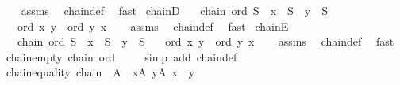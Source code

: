 \begin{isabellebody}
%
\isadelimproof
\ \ %
\endisadelimproof
%
\isatagproof
{}\isamarkupfalse%
\ assms\ \isamarkupfalse%
\ chain{\isacharunderscore}{\kern0pt}def\ \isamarkupfalse%
\ fast%
\endisatagproof
{\isafoldproof}%
%
\isadelimproof
\isanewline
%
\endisadelimproof
\isanewline
{}\isamarkupfalse%
\ chainD{\isacharcolon}{\kern0pt}\isanewline
\ \ \ {\isachardoublequoteopen}chain\ ord\ S{\isachardoublequoteclose}\ \ {\isachardoublequoteopen}x\ {\isasymin}\ S{\isachardoublequoteclose}\ \ {\isachardoublequoteopen}y\ {\isasymin}\ S{\isachardoublequoteclose}\isanewline
\ \ \ {\isachardoublequoteopen}ord\ x\ y\ {\isasymor}\ ord\ y\ x{\isachardoublequoteclose}\isanewline
%
\isadelimproof
\ \ %
\endisadelimproof
%
\isatagproof
{}\isamarkupfalse%
\ assms\ \isamarkupfalse%
\ chain{\isacharunderscore}{\kern0pt}def\ \isamarkupfalse%
\ fast%
\endisatagproof
{\isafoldproof}%
%
\isadelimproof
\isanewline
%
\endisadelimproof
\isanewline
{}\isamarkupfalse%
\ chainE{\isacharcolon}{\kern0pt}\isanewline
\ \ \ {\isachardoublequoteopen}chain\ ord\ S{\isachardoublequoteclose}\ \ {\isachardoublequoteopen}x\ {\isasymin}\ S{\isachardoublequoteclose}\ \ {\isachardoublequoteopen}y\ {\isasymin}\ S{\isachardoublequoteclose}\isanewline
\ \ \ {\isachardoublequoteopen}ord\ x\ y{\isachardoublequoteclose}\ {\isacharbar}{\kern0pt}\ {\isachardoublequoteopen}ord\ y\ x{\isachardoublequoteclose}\isanewline
%
\isadelimproof
\ \ %
\endisadelimproof
%
\isatagproof
{}\isamarkupfalse%
\ assms\ \isamarkupfalse%
\ chain{\isacharunderscore}{\kern0pt}def\ \isamarkupfalse%
\ fast%
\endisatagproof
{\isafoldproof}%
%
\isadelimproof
\isanewline
%
\endisadelimproof
\isanewline
{}\isamarkupfalse%
\ chain{\isacharunderscore}{\kern0pt}empty{\isacharcolon}{\kern0pt}\ {\isachardoublequoteopen}chain\ ord\ {\isacharbraceleft}{\kern0pt}{\isacharbraceright}{\kern0pt}{\isachardoublequoteclose}\isanewline
%
\isadelimproof
\ \ %
\endisadelimproof
%
\isatagproof
{}\isamarkupfalse%
\ {\isacharparenleft}{\kern0pt}simp\ add{\isacharcolon}{\kern0pt}\ chain{\isacharunderscore}{\kern0pt}def{\isacharparenright}{\kern0pt}%
\endisatagproof
{\isafoldproof}%
%
\isadelimproof
\isanewline
%
\endisadelimproof
\isanewline
{}\isamarkupfalse%
\ chain{\isacharunderscore}{\kern0pt}equality{\isacharcolon}{\kern0pt}\ {\isachardoublequoteopen}chain\ {\isacharparenleft}{\kern0pt}{\isacharequal}{\kern0pt}{\isacharparenright}{\kern0pt}\ A\ {\isasymlongleftrightarrow}\ {\isacharparenleft}{\kern0pt}{\isasymforall}x{\isasymin}A{\isachardot}{\kern0pt}\ {\isasymforall}y{\isasymin}A{\isachardot}{\kern0pt}\ x\ {\isacharequal}{\kern0pt}\ y{\isacharparenright}{\kern0pt}{\isachardoublequoteclose}\isanewline

\end{isabellebody}
